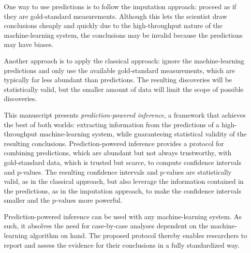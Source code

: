 \documentclass[10pt]{article}
\begin{document}
One way to use predictions is to follow the imputation approach: proceed as if they are gold-standard measurements. Although this lets the scientist draw conclusions cheaply and quickly due to the high-throughput nature of the machine-learning system, the conclusions may be invalid because the predictions may have biases. 


Another approach is to apply the classical approach: ignore the machine-learning predictions and only use the available gold-standard measurements, which are typically far less abundant than predictions. The resulting discoveries will be statistically valid, but the smaller amount of data will limit the scope of possible discoveries.

This manuscript presents \emph{prediction-powered inference}, a framework that achieves the best of both worlds: extracting information from the predictions of a high-throughput machine-learning system, while guaranteeing statistical validity of the resulting conclusions. Prediction-powered inference provides a protocol for combining predictions, which are abundant but not always trustworthy, with gold-standard data, which is trusted but scarce, to compute confidence intervals and p-values. The resulting confidence intervals and p-values are statistically valid, as in the classical approach, but also leverage the information contained in the predictions, as in the imputation approach, to make the confidence intervals smaller and the p-values more powerful. 

Prediction-powered inference can be used with any machine-learning system. As such, it absolves the need for case-by-case analyses dependent on the machine-learning algorithm on hand. The proposed protocol thereby enables researchers to report and assess the evidence for their conclusions in a fully standardized way. 



\end{document}
